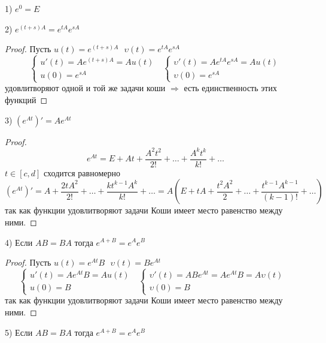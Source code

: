 \begin{block}[Свойства]
  1) $e^0 = E$

  2) $e^{(t+s)A} = e^{tA} e^{sA}$

  \begin{proof}
    Пусть $u(t) = e^{(t+s)A} ~~~ \upsilon(t) = e^{tA} e^{sA}$
    $$
    \left\{
    \begin{array}{l}
      u'(t) = A e^{(t+s)A} = Au(t) \\
      u(0) = e^{sA}
    \end{array}
    \right. ~~~
    \left\{
    \begin{array}{l}
      \upsilon'(t) = A e^{tA} e^{sA}= Au(t) \\
      \upsilon(0) = e^{sA}
    \end{array}
    \right.
    $$
    удовлитворяют одной и той же задачи коши $\Rightarrow$ есть единственность
    этих функций
  \end{proof}

  3) $(e^{At})' = A e^{At}$

  \begin{proof}
    $$
    e^{At} = E + At + \frac{A^2t^2}{2!} + \ldots + \frac{A^k t^k}{k!} + \ldots
    $$
    $t \in [c,d]$ сходится равномерно
    $$
    (e^{At})' = A + \frac{2tA^2}{2!} + \ldots + \frac{kt^{k-1}A^k}{k!} +
    \ldots = A\left(E + tA + \frac{t^2A^2}{2} + \ldots +
    \frac{t^{k-1}A^{k-1}}{(k-1)!} + \ldots\right)
    $$
    так как функции удовлитворяют задачи Коши имеет место равенство между ними.
  \end{proof}

  4) Если $AB = BA$ тогда $e^{A+B} = e^A e^B$

  \begin{proof}
    Пусть $u(t) = e^{At}B ~~~ \upsilon(t) = Be^{At}$
    $$
    \left\{
    \begin{array}{l}
      u'(t) = A e^{At} B = Au(t) \\
      u(0) = B
    \end{array}
    \right. ~~~
    \left\{
    \begin{array}{l}
      \upsilon'(t) = A B e^{At} =  A e^{At} B = A\upsilon(t) \\
      \upsilon(0) = B
    \end{array}
    \right. ~~~
    $$
    так как функции удовлитворяют задачи Коши имеет место равенство между ними.
  \end{proof}

  5) Если $AB = BA$ тогда $e^{A+B} = e^A e^B$


\end{block}
